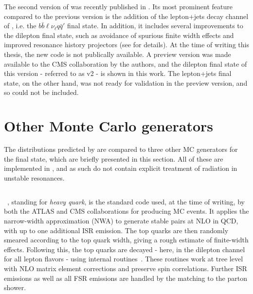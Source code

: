 The second version of \bbfourl was recently published in . Its most prominent feature compared to the previous version is the addition of the lepton+jets decay channel of \ttbar, i.e. the $b \bar{b} \ell \nu_{\ell} q \bar{q}'$ final state. In addition, it includes several improvements to the dilepton final state, such as avoidance of spurious finite width effects and improved resonance history projectors (see  for details). At the time of writing this thesis, the new code is not publically available. A preview version was made available to the CMS collaboration by the authors, and the dilepton final state of this version - referred to as \bbfourl v2 - is shown in this work. The lepton+jets final state, on the other hand, was not ready for validation in the preview version, and so could not be included.

\section{Other \ttbartitle Monte Carlo generators}
\label{sec:bb4l:others}

The distributions predicted by \bbfourl are compared to three other MC generators for the \tttW final state, which are briefly presented in this section. All of these are implemented in \powhegvtwo, and as such do not contain explicit treatment of radiation in unstable resonances.

\subsection{\texorpdfstring{\hvq}{hvq}}

\hvq~\cite{Frixione:2007nw}, standing for \textit{heavy quark}, is the standard code used, at the time of writing, by both the ATLAS and CMS collaborations for producing \ttbar MC events. It applies the narrow-width approximation (NWA) to generate stable \ttbar pairs at NLO in QCD, with up to one additional ISR emission. The top quarks are then randomly smeared according to the top quark width, giving a rough estimate of finite-width effects. Following this, the top quarks are decayed - here, in the dilepton channel for all lepton flavors - using internal \powheg routines~\cite{Frixione:2007zp}. These routines work at tree level with NLO matrix element corrections and preserve spin correlations. Further ISR emissions as well as all FSR emissions are handled by the matching to the parton shower.

\subsection{\texorpdfstring{\ST}{ST\_wtch}}

